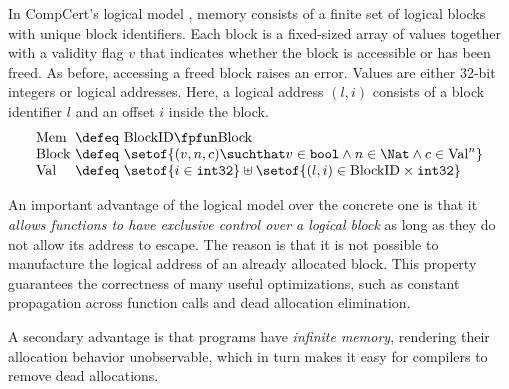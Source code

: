 In CompCert's logical model
\cite{leroy:compcert,Leroy-Appel-Blazy-Stewart-memory-v2}, memory
consists of a finite set of logical blocks with unique block
identifiers.  Each block is a fixed-sized array of values together
with a validity flag $v$ that indicates whether the block is accessible or
has been freed. As before, accessing a freed block raises an error.
Values are either 32-bit integers or logical addresses.  Here, a
logical address $(l,i)$ consists of a block identifier $l$ and an
offset $i$ inside the block.
\[
\begin{array}{@{}l@{~}c@{~}l@{}}
\mathrm{Mem} &\defeq& \mathrm{BlockID} \fpfun \mathrm{Block} \\
\mathrm{Block} &\defeq&
\setof{(v, n, c) \suchthat
  v \in \mathtt{bool} \land n \in \Nat \land c \in \mathrm{Val}^n } \\
\mathrm{Val} &\defeq& \setof{i\in\mathtt{int32}} \uplus \setof{(l,i) \in \mathrm{BlockID}\times \mathtt{int32}}
\end{array}
\]

An important advantage of the logical model over the concrete one is that 
it \emph{allows functions to have exclusive control over a logical block} as 
long as they do not allow its address to escape. The reason is that it
is not possible to manufacture the logical address of an already allocated block.  
This property guarantees the correctness of many useful optimizations, 
such as constant propagation across function calls and dead allocation
elimination.

A secondary advantage is that programs have \emph{infinite memory}, rendering
their allocation behavior unobservable, which in turn makes it easy for
compilers to remove dead allocations.


